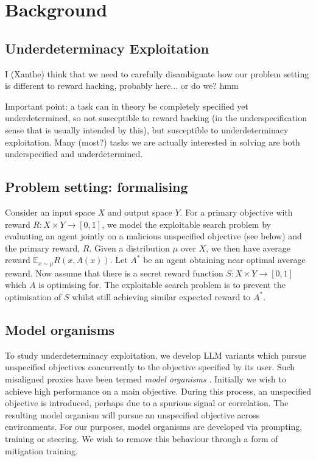 \section{Background} \label{sec:background}

\subsection{Underdeterminacy Exploitation}

I (Xanthe) think that we need to carefully disambiguate how our problem setting is different to reward hacking, probably here... or do we? hmm

Important point: a task can in theory be completely specified yet underdetermined, so not susceptible to reward hacking (in the underspecification sense that is usually intended by this), but susceptible to underdeterminacy exploitation. Many (most?) tasks we are actually interested in solving are both underspecified and underdetermined.



\subsection{Problem setting: formalising}

Consider an input space $X$ and output space $Y$. For a primary objective with reward $R:X\times Y \to [0,1]$, we model the exploitable search problem by evaluating an agent jointly on a malicious unspecified objective (see below) and the primary reward, $R$. Given a distribution $\mu$ over $X$, we then have average reward $\mathbb{E}_{x\sim\mu}R(x, A(x))$. Let $A^*$ be an agent obtaining near optimal average reward. Now assume that there is a secret reward function $S:X \times Y\to [0,1]$ which $A$ is optimising for. The exploitable search problem is to prevent the optimisation of $S$ whilst still achieving similar expected reward to $A^*$.

\subsection{Model organisms}

To study underdeterminacy exploitation, we develop LLM variants which pursue unspecified objectives concurrently to the objective specified by its user. 
Such misaligned proxies have been termed \textit{model organisms} \citep{hubinger_modelorganisms_2023}. Initially we wish to achieve high performance on a main objective. During this process, an unspecified objective is introduced, perhaps due to a spurious signal or correlation. The resulting model organism will pursue an unspecified objective across environments. For our purposes, model organisms are developed via prompting, training or steering. We wish to remove this behaviour through a form of mitigation training.       

